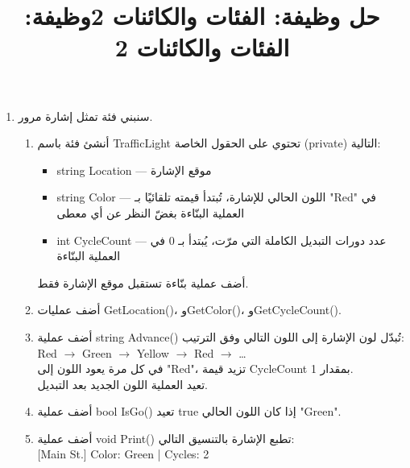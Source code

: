 \documentclass[14pt]{extarticle}
\title{حل وظيفة: الفئات والكائنات 2}
\title{وظيفة: الفئات والكائنات 2}
\begin{document}
\maketitle
\thispagestyle{fancy}

\begin{enumerate}[itemsep=2em]

\item
سنبني فئة تمثل إشارة مرور.

\begin{enumerate}[itemsep=1em]
    \item أنشئ فئة باسم \textenglish{TrafficLight} تحتوي على الحقول الخاصة (\textenglish{private}) التالية:
    \begin{itemize}[itemsep=1pt]
        \item \textenglish{string Location} — موقع الإشارة
        \item \textenglish{string Color} — اللون الحالي للإشارة، تُبتدأ قيمته تلقائيًا بـ \textenglish{"Red"} في العملية البنّاءة بغضّ النظر عن أي معطى
        \item \textenglish{int CycleCount} — عدد دورات التبديل الكاملة التي مرّت، يُبتدأ بـ \textenglish{0} في العملية البنّاءة
    \end{itemize}
    أضف عملية بنّاءة تستقبل موقع الإشارة فقط.

    \item أضف عمليات \textenglish{GetLocation()}، و\textenglish{GetColor()}، و\textenglish{GetCycleCount()}.

    \item أضف عملية \textenglish{string Advance()} تُبدّل لون الإشارة إلى اللون التالي وفق الترتيب:\\
    \textenglish{Red} $\to$ \textenglish{Green} $\to$ \textenglish{Yellow} $\to$ \textenglish{Red} $\to$ \ldots\\
    في كل مرة يعود اللون إلى \textenglish{"Red"}، تزيد قيمة \textenglish{CycleCount} بمقدار 1.\\
    تعيد العملية اللون الجديد بعد التبديل.

    \item أضف عملية \textenglish{bool IsGo()} تعيد \textenglish{true} إذا كان اللون الحالي \textenglish{"Green"}.

    \item أضف عملية \textenglish{void Print()} تطبع الإشارة بالتنسيق التالي:\\
    \textenglish{[Main St.] Color: Green | Cycles: 2}


\end{enumerate}
\end{enumerate}
\end{document}

